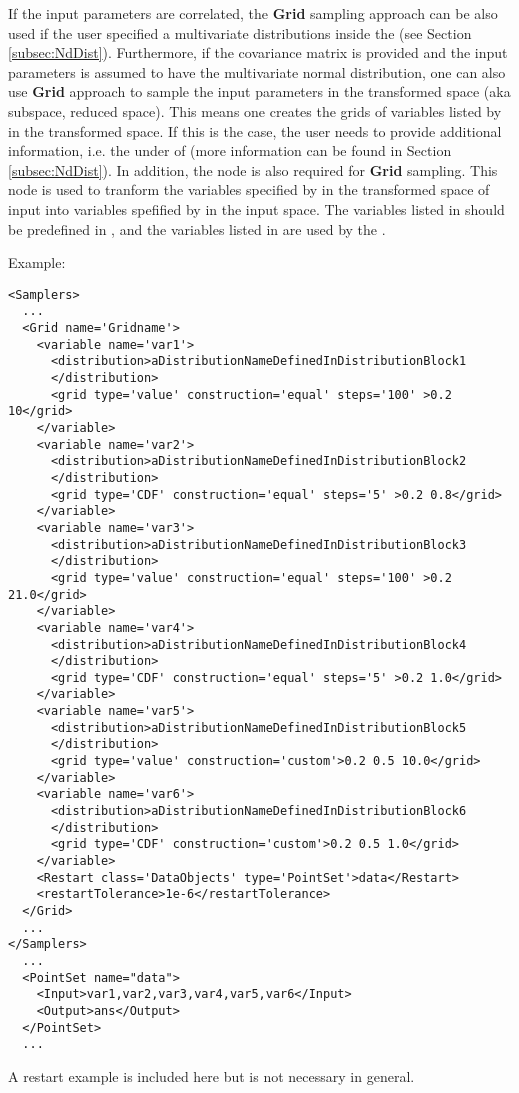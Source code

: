 If the input parameters are correlated, the \textbf{Grid} sampling approach can be also used if the user specified a
multivariate distributions inside the  (see Section \ref{subsec:NdDist}). Furthermore, if the
covariance matrix is provided and the input parameters is assumed to have the multivariate normal distribution, one can also use
\textbf{Grid} approach to sample the input parameters in the transformed space (aka subspace, reduced space). This means one creates
the grids of variables listed by  in the transformed space. If this is the case, the user needs to
provide additional information, i.e. the  under  of 
(more information can be found in Section \ref{subsec:NdDist}). In addition, the node  is also
required for \textbf{Grid} sampling. This node is used to tranform the variables specified by  in the
transformed space of input into variables spefified by  in the input space. The variables listed
in  should be predefined in , and the variables listed in 
are used by the .



Example:
\begin{lstlisting}[style=XML,morekeywords={construction,steps,lowerBound,upperBound}]
<Samplers>
  ...
  <Grid name='Gridname'>
    <variable name='var1'>
      <distribution>aDistributionNameDefinedInDistributionBlock1
      </distribution>
      <grid type='value' construction='equal' steps='100' >0.2 10</grid>
    </variable>
    <variable name='var2'>
      <distribution>aDistributionNameDefinedInDistributionBlock2
      </distribution>
      <grid type='CDF' construction='equal' steps='5' >0.2 0.8</grid>
    </variable>
    <variable name='var3'>
      <distribution>aDistributionNameDefinedInDistributionBlock3
      </distribution>
      <grid type='value' construction='equal' steps='100' >0.2 21.0</grid>
    </variable>
    <variable name='var4'>
      <distribution>aDistributionNameDefinedInDistributionBlock4
      </distribution>
      <grid type='CDF' construction='equal' steps='5' >0.2 1.0</grid>
    </variable>
    <variable name='var5'>
      <distribution>aDistributionNameDefinedInDistributionBlock5
      </distribution>
      <grid type='value' construction='custom'>0.2 0.5 10.0</grid>
    </variable>
    <variable name='var6'>
      <distribution>aDistributionNameDefinedInDistributionBlock6
      </distribution>
      <grid type='CDF' construction='custom'>0.2 0.5 1.0</grid>
    </variable>
    <Restart class='DataObjects' type='PointSet'>data</Restart>
    <restartTolerance>1e-6</restartTolerance>
  </Grid>
  ...
</Samplers>
  ...
  <PointSet name="data">
    <Input>var1,var2,var3,var4,var5,var6</Input>
    <Output>ans</Output>
  </PointSet>
  ...
\end{lstlisting}
\nb A restart example is included here but is not necessary in general.

